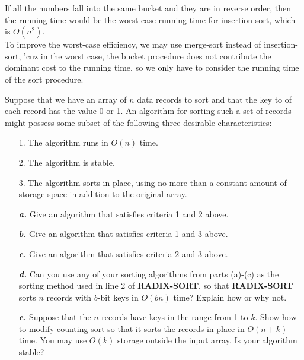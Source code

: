\documentclass[12pt, a4paper, UTF8]{ctexart}
\begin{document}
\begin{solution}
  If all the numbers fall into the same bucket and they are in reverse 
  order, then the running time would be the worst-case running time for 
  insertion-sort, which is $O(n^{2})$.\\
  To improve the worst-case efficiency, we may use merge-sort instead 
  of insertion-sort, 'cuz in the worst case, the bucket procedure does 
  not contribute the dominant cost to the running time, so we only have 
  to consider the running time of the sort procedure.
\end{solution}

\begin{problem}[TC: 8-2]
  Suppose that we have an array of $n$ data records to sort and that the 
  key to of each record has the value 0 or 1. An algorithm for sorting 
  such a set of records might possess some subset of the following three 
  desirable characteristics:
  \begin{itemize}
    \item [1.] The algorithm runs in $O(n)$ time.
    \item [2.] The algorithm is stable.
    \item [3.] The algorithm sorts in place, using no more than a constant 
      amount of storage space in addition to the original array.
    \item [\textsl{\textbf{a.}}] Give an algorithm that satisfies criteria 
      1 and 2 above.
    \item [\textsl{\textbf{b.}}] Give an algorithm that satisfies criteria 
      1 and 3 above.
    \item [\textsl{\textbf{c.}}] Give an algorithm that satisfies criteria 
      2 and 3 above.
    \item [\textsl{\textbf{d.}}] Can you use any of your sorting algorithms 
      from parts (a)-(c) as the sorting method used in line 2 of \textbf{RADIX-SORT}, 
      so that \textbf{RADIX-SORT} sorts $n$ records with $b$-bit keys in 
      $O(bn)$ time? Explain how or why not.
    \item [\textsl{\textbf{e.}}] Suppose that the $n$ records have keys 
      in the range from 1 to $k$. Show how to modify counting sort so 
      that it sorts the records in place in $O(n+k)$ time. You may use 
      $O(k)$ storage outside the input array. Is your algorithm stable?
  \end{itemize}
\end{problem}
\end{document}
